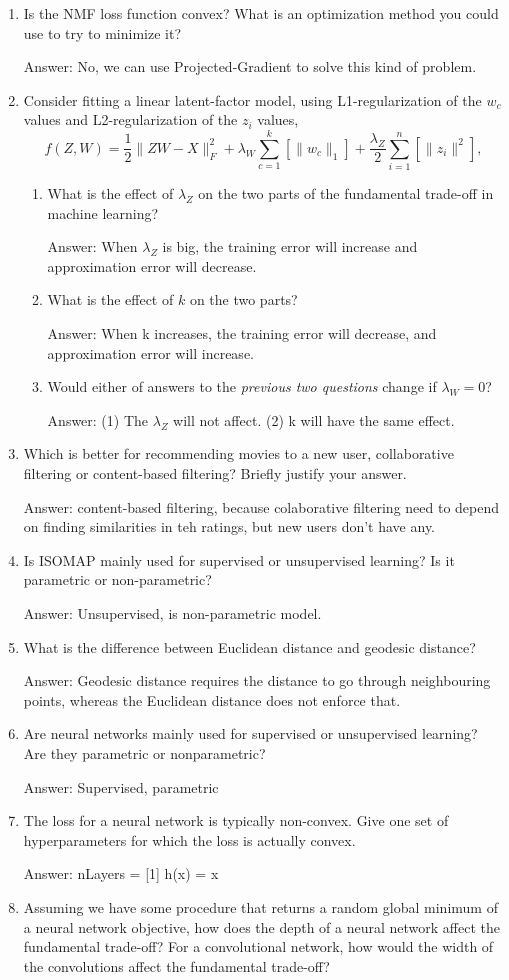 \documentclass{article}
\def\ans#1{\par\gre{Answer: #1}}
\def\blu#1{{\color{blu}#1}}
\def\gre#1{{\color{gre}#1}}
\def\norm#1{\|#1\|}
\def\enum#1{\begin{enumerate}#1\end{enumerate}}
\begin{document}
\blu{
\enum{
\item Is the NMF loss function convex? What is an optimization method you could use to try to minimize it? \ans{No, we can use Projected-Gradient to solve this kind of problem.}
\item Consider fitting a linear latent-factor model, using L1-regularization of the $w_c$ values and L2-regularization of the $z_i$ values,
\[
f(Z,W) = \frac{1}{2}\norm{ZW - X}_F^2 + \lambda_W \sum_{c=1}^k \left[\norm{w_c}_1\right] + \frac{\lambda_Z}{2} \sum_{i=1}^n \left[\norm{z_i}^2\right],
\]
\enum{
\item What is the effect of $\lambda_Z$ on the two parts of the fundamental trade-off in machine learning? \ans{When $\lambda _Z$ is big, the training error will increase and approximation error will decrease.}
\item What is the effect of $k$ on the two parts? \ans{When k increases, the training error will decrease, and approximation error will increase.}
\item Would either of answers to the \emph{previous two questions} change if $\lambda_W = 0$? \ans{(1) The $\lambda_Z$ will not affect. (2) k will have the same effect.}
}
\item Which is better for recommending movies to a new user, collaborative filtering or content-based filtering? Briefly justify your answer.
\ans{content-based filtering, because colaborative filtering need to depend on finding similarities in teh ratings, but new users don't have any.}
\item Is ISOMAP mainly used for supervised or unsupervised learning? Is it parametric or non-parametric?
\ans{Unsupervised, is non-parametric model.}
\item What is the difference between Euclidean distance and geodesic distance?
\ans{Geodesic distance requires the distance to go through neighbouring points, whereas the Euclidean distance does not enforce that.}
\item Are neural networks mainly used for supervised or unsupervised learning? Are they parametric or nonparametric?
\ans{Supervised, parametric}
\item The loss for a neural network is typically non-convex. Give one set of hyperparameters for which the loss is actually convex.
\ans{nLayers = [1] h(x) = x}
\item Assuming we have some procedure that returns a random global minimum of a neural network objective, how does the depth of a neural network affect the fundamental trade-off? For a convolutional network, how would the width of the convolutions affect the fundamental trade-off?
}}
\end{document}
